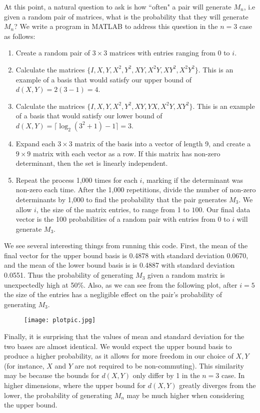 At this point, a natural question to ask is how ``often" a pair will generate $M_n$, i.e given a random pair of matrices, what is the probability that they will generate $M_n$? We write a program in MATLAB to address this question in the $n=3$ case as follows:
\begin{enumerate}
    \item Create a random pair of $3\times3$ matrices with entries ranging from 0 to $i$. 
    \item Calculate the matrices $\{I,X,Y,X^2,Y^2,XY,X^2Y,XY^2,X^2Y^2\}$. This is an example of a basis that would satisfy our upper bound of $d(X,Y)=2(3-1)=4$. 
    \item Calculate the matrices $\{I,X,Y,X^2,Y^2,XY,YX,X^2Y,XY^2\}$. This is an example of a basis that would satisfy our lower bound of $d(X,Y)=\lceil\log_2(3^2+1)-1\rceil=3$. 
    \item Expand each $3\times3$ matrix of the basis into a vector of length 9, and create a $9\times9$ matrix with each vector as a row. If this matrix has non-zero determinant, then the set is linearly independent. 
    \item Repeat the process 1,000 times for each $i$, marking if the determinant was non-zero each time. After the 1,000 repetitions, divide the number of non-zero determinants by 1,000 to find the probability that the pair generates $M_3$. We allow $i$, the size of the matrix entries, to range from 1 to $100$. Our final data vector is the 100 probabilities of a random pair with entries from 0 to $i$ will generate $M_3$.
\end{enumerate}
We see several interesting things from running this code. First, the mean of the final vector for the upper bound basis is 0.4878 with standard deviation 0.0670, and the mean of the lower bound basis is is 0.4887 with standard deviation 0.0551. Thus the probability of generating $M_3$ given a random matrix is unexpectedly high at 50\%. Also, as we can see from the following plot, after $i=5$ the size of the entries has a negligible effect on the pair's probability of generating $M_3$. 
\begin{figure}[H]
\centering
    \texttt{[image: plotpic.jpg]}
\end{figure}
Finally, it is surprising that the values of mean and standard deviation for the two bases are almost identical. We would expect the upper bound basis to produce a higher probability, as it allows for more freedom in our choice of $X,Y$ (for instance, $X$ and $Y$ are not required to be non-commuting). This similarity may be because the bounds for $d(X,Y)$ only differ by 1 in the $n=3$ case. In higher dimensions, where the upper bound for $d(X,Y)$ greatly diverges from the lower, the probability of generating $M_n$ may be much higher when considering the upper bound.  




